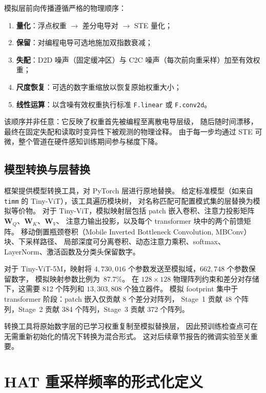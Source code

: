 模拟层前向传播遵循严格的物理顺序：
\begin{enumerate}
\item \textbf{量化}：浮点权重 $\rightarrow$ 差分电导对 $\rightarrow$ STE 量化；
\item \textbf{保留}：对编程电导可选地施加双指数衰减；
\item \textbf{失配}：D2D 噪声（固定缓冲区）与 C2C 噪声（每次前向重采样）加至有效权重；
\item \textbf{尺度恢复}：可选的数字重缩放以恢复原始权重大小；
\item \textbf{线性运算}：以含噪有效权重执行标准 \texttt{F.linear} 或 \texttt{F.conv2d}。
\end{enumerate}

该顺序并非任意：它反映了权重首先被编程至离散电导层级，
随后随时间漂移，最终在固定失配和读取时变异性下被观测的物理诠释。
由于每一步均通过 STE 可微，整个管道在硬件感知训练期间参与梯度下降。

\subsection{模型转换与层替换}

框架提供模型转换工具，对 PyTorch 层进行原地替换。
给定标准模型（如来自 \texttt{timm} 的 Tiny-ViT），该工具遍历模块树，
对名称匹配可配置模式集的层替换为模拟等价物。
对于 Tiny-ViT，模拟映射层包括 patch 嵌入卷积、注意力投影矩阵 $\mathbf{W}_Q$、$\mathbf{W}_K$、$\mathbf{W}_V$、
注意力输出投影，以及每个 transformer 块中的两个前馈矩阵。
移动倒置瓶颈卷积（Mobile Inverted Bottleneck Convolution, MBConv）块、下采样路径、
局部深度可分离卷积、动态注意力乘积、softmax、LayerNorm、激活函数及分类头保留数字。

对于 Tiny-ViT-5M，映射将 $4{,}730{,}016$ 个参数发送至模拟域，$662{,}748$ 个参数保留数字，
模拟映射参数比例为~$87.7\%$。
在 $128 \times 128$ 物理阵列约束和差分对存储下，这需要 812 个阵列和 $13{,}303{,}808$ 个独立器件。
模拟 footprint 集中于 transformer 阶段：patch 嵌入仅贡献 8 个差分对阵列，
Stage~1 贡献 48 个阵列，Stage~2 贡献 384 个阵列，Stage~3 贡献 372 个阵列。

转换工具将原始数字层的已学习权重复制至模拟替换层，
因此预训练检查点可在无需重新初始化的情况下转换为混合形式。
这对后续章节报告的微调实验至关重要。

\section{HAT 重采样频率的形式化定义}
\label{sec:cadence-definitions}

